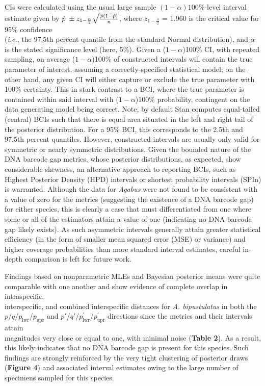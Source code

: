 \documentclass[12pt]{article}
\begin{document}
\noindent  CIs were calculated using the usual large sample  $(1-\alpha)100\%$-level interval estimate given by $\hat{p} \hspace{1mm} \pm z_{1 - \frac{\alpha}{2}}\sqrt{\frac{\hat{p}(1 - \hat{p})}{n}}$, where $z_{1 - \frac{\alpha}{2}}$ = 1.960 is the critical value for 95\% confidence \\ (\textit{i.e.}, the 97.5th percent quantile from the standard Normal distribution), and $\alpha$ is the stated significance level (here, 5\%). Given a ($1 - \alpha$)100\% CI, with repeated sampling, on average ($1 - \alpha$)100\% of constructed intervals will contain the true parameter of interest, assuming a correctly-specified statistical model; on the other hand, any given CI will either capture or exclude the true parameter with 100\% certainty. This in stark contrast to a BCI, where the true parameter is contained within said interval with ($1 - \alpha$)100\% probability, contingent on the data generating model being correct. Note, by default Stan computes equal-tailed (central) BCIs such that there is equal area situated in the left and right tail of the posterior distribution. For a 95\% BCI, this corresponds to the 2.5th and 97.5th percent quantiles. However, constructed intervals are usually only valid for symmetric or nearly symmetric distributions. Given the bounded nature of the DNA barcode gap metrics, whose posterior distributions, as expected, show considerable skewness, an alternative approach to reporting BCIs, such as Highest Posterior Density (HPD) intervals \citep{chen1999monte} or shortest probability intervals (SPIn) \citep{liu2015simulation} is warranted. Although the data for \textit{Agabus} were not found to be consistent with a value of zero for the metrics (suggesting the existence of a DNA barcode gap) for either species, this is clearly a case that must differentiated from one where some or all of the estimators attain a value of one (indicating no DNA barcode gap likely exists).  As such asymmetric intervals generally attain greater statistical efficiency (in the form of smaller mean squared error (MSE) or variance) and higher coverage probabilities than more standard interval estimates, careful in-depth comparison is left for future work. 

Findings based on nonparametric MLEs and Bayesian posterior means were quite \\ comparable with one another and show evidence of complete overlap in intraspecific, \\ interspecific, and combined interspecific distances for \textit{A. bipustulatus} in both the \\ $p$/$q$/$p_{\mathrm{lwr}}$/$p_{\mathrm{upr}}$ and $p'$/$q'$/$p^{'}_{\mathrm{lwr}}$/$p^{'}_{\mathrm{upr}}$ directions since the metrics and their intervals attain \\ magnitudes very close or equal to one, with minimal noise (\textbf{Table 2}). As a result, this likely indicates that no DNA barcode gap is present for this species. Such findings are strongly reinforced by the very tight clustering of posterior draws (\textbf{Figure 4}) and associated interval estimates owing to the large number of specimens sampled for this species.
\end{document}
